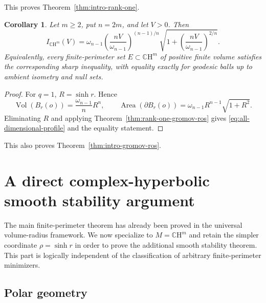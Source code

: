 \documentclass[11pt,reqno]{amsart}
\numberwithin{equation}{section}
\newtheorem{corollary}[theorem]{Corollary}
\theoremstyle{definition}
\theoremstyle{remark}
\newcommand{\CH}{\mathbb{C}\mathrm{H}}
\newcommand{\Area}{\operatorname{Area}}
\newcommand{\Vol}{\operatorname{Vol}}
\begin{document}
This proves Theorem~\ref{thm:intro-rank-one}.

\begin{corollary}
\label{thm:gromov-ros-all-m}
Let $m\ge2$, put $n=2m$, and let $V>0$.  Then
\begin{equation}
 I_{\CH^m}(V)
 =\omega_{n-1}
 \left(\frac{nV}{\omega_{n-1}}\right)^{(n-1)/n}
 \sqrt{1+\left(\frac{nV}{\omega_{n-1}}\right)^{2/n}}.
 \label{eq:all-dimensional-profile}
\end{equation}
Equivalently, every finite-perimeter set $E\subset\CH^m$ of positive finite
volume satisfies the corresponding sharp inequality, with equality exactly
for geodesic balls up to ambient isometry and null sets.
\end{corollary}

\begin{proof}
For $q=1$, $R=\sinh r$.  Hence
\[
 \Vol(B_r(o))=\frac{\omega_{n-1}}nR^n,
 \qquad
 \Area(\partial B_r(o))=\omega_{n-1}R^{n-1}\sqrt{1+R^2}.
\]
Eliminating $R$ and applying Theorem~\ref{thm:rank-one-gromov-ros} gives
\eqref{eq:all-dimensional-profile} and the equality statement.
\end{proof}

This also proves Theorem~\ref{thm:intro-gromov-ros}.

\section{A direct complex-hyperbolic smooth stability argument}\label{sec:geometric-setup}

The main finite-perimeter theorem has already been proved in the universal
volume-radius framework.  We now specialize to $M=\CH^m$ and retain the
simpler coordinate $\rho=\sinh r$ in order to prove the additional smooth
stability theorem.  This part is logically independent of the classification
of arbitrary finite-perimeter minimizers.


\subsection{Polar geometry}
\end{document}
